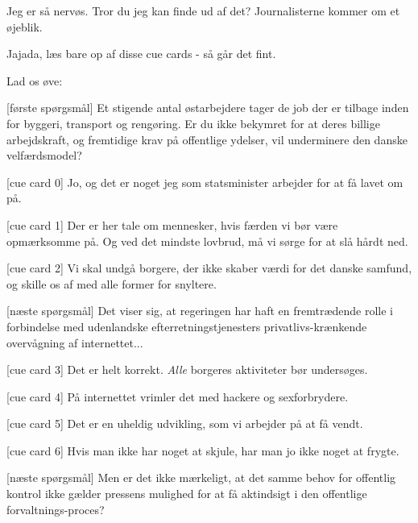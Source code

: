 \documentclass[a4paper,11pt]{article}
\begin{document}
\begin{sketch}


 Jeg er så nervøs. Tror du jeg kan finde ud af det? Journalisterne kommer om et øjeblik.

 Jajada, læs bare op af disse cue cards - så går det fint.


 Lad os øve:


[første spørgsmål] Et stigende antal østarbejdere tager de job der er tilbage inden for byggeri, transport og rengøring. Er du ikke bekymret for at deres billige arbejdskraft, og fremtidige krav på offentlige ydelser, vil underminere den danske velfærdsmodel?


[cue card 0] Jo, og det er noget jeg som statsminister arbejder for at få lavet om på.

[cue card 1] Der er her tale om mennesker, hvis færden vi bør være opmærksomme på. Og ved det mindste lovbrud, må vi sørge for at slå hårdt ned.

[cue card 2] Vi skal undgå borgere, der ikke skaber værdi for det danske samfund, og skille os af med alle former for snyltere.

[næste spørgsmål] Det viser sig, at regeringen har haft en fremtrædende rolle i forbindelse med udenlandske efterretningstjenesters privatlivs-krænkende overvågning af internettet...

[cue card 3] Det er helt korrekt. \emph{Alle} borgeres aktiviteter bør undersøges.

[cue card 4] På internettet vrimler det med hackere og sexforbrydere.


[cue card 5] Det er en uheldig udvikling, som vi arbejder på at få vendt.

[cue card 6] Hvis man ikke har noget at skjule, har man jo ikke noget at frygte.

[næste spørgsmål] Men er det ikke mærkeligt, at det samme behov for offentlig kontrol ikke gælder pressens mulighed for at få aktindsigt i den offentlige forvaltnings-proces?


\end{sketch}
\end{document}
